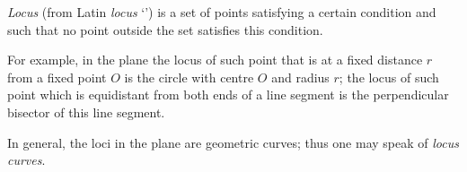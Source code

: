 \documentclass[12pt]{article}
\theoremstyle{definition}
\begin{document}
{\em Locus} (from Latin {\em locus} `') is a set of points satisfying a certain condition and such that no point outside the set satisfies this condition.

For example, in the plane the locus of such point that is at a fixed distance $r$ from a fixed point $O$ is the circle with centre $O$ and radius $r$; the locus of such point which is equidistant from both ends of a line segment is the perpendicular bisector of this line segment.

In general, the loci in the plane are geometric curves; thus one may speak of {\em locus curves}.
\end{document}
